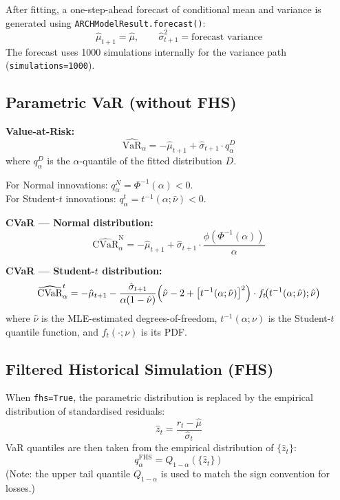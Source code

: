 \documentclass[11pt, a4paper]{article}
\begin{document}
After fitting, a one-step-ahead forecast of conditional mean and variance
is generated using \texttt{ARCHModelResult.forecast()}:
\begin{equation}
\hat{\mu}_{t+1} = \hat{\mu}, \qquad \hat{\sigma}_{t+1}^2 = \text{forecast variance}
\end{equation}
The forecast uses 1000 simulations internally for the variance path
(\texttt{simulations=1000}).

\subsection{Parametric VaR (without FHS)}

\textbf{Value-at-Risk:}
\begin{equation}
\widehat{\text{VaR}}_\alpha
= -\hat{\mu}_{t+1} + \hat{\sigma}_{t+1} \cdot q_\alpha^D
\label{eq:gjr_var}
\end{equation}
where $q_\alpha^D$ is the $\alpha$-quantile of the fitted distribution $D$.

For Normal innovations: $q_\alpha^N = \Phi^{-1}(\alpha) < 0$. \\
For Student-$t$ innovations: $q_\alpha^t = t^{-1}(\alpha; \hat{\nu}) < 0$.

\textbf{CVaR --- Normal distribution:}
\begin{equation}
\widehat{\text{CVaR}}_\alpha^{\text{N}}
= -\hat{\mu}_{t+1} + \hat{\sigma}_{t+1} \cdot
  \frac{\phi\!\left(\Phi^{-1}(\alpha)\right)}{\alpha}
\label{eq:gjr_cvar_norm}
\end{equation}

\textbf{CVaR --- Student-$t$ distribution:}
\begin{equation}
\widehat{\text{CVaR}}_\alpha^{t}
= -\hat{\mu}_{t+1}
  - \frac{\hat{\sigma}_{t+1}}{\alpha(1 - \hat{\nu})}
    \Bigl(\hat{\nu} - 2 + \bigl[t^{-1}(\alpha;\hat{\nu})\bigr]^2\Bigr)
    \cdot f_t\!\bigl(t^{-1}(\alpha;\hat{\nu});\hat{\nu}\bigr)
\label{eq:gjr_cvar_t}
\end{equation}
where $\hat{\nu}$ is the MLE-estimated degrees-of-freedom, $t^{-1}(\alpha;\nu)$
is the Student-$t$ quantile function, and $f_t(\cdot;\nu)$ is its PDF.

\subsection{Filtered Historical Simulation (FHS)}

When \texttt{fhs=True}, the parametric distribution is replaced by the
empirical distribution of standardised residuals:
\begin{equation}
\hat{z}_t = \frac{r_t - \hat{\mu}}{\hat{\sigma}_t}
\end{equation}
VaR quantiles are then taken from the empirical distribution of $\{\hat{z}_t\}$:
\begin{equation}
q_\alpha^{\text{FHS}} = Q_{1-\alpha}\!\left(\{\hat{z}_t\}\right)
\end{equation}
(Note: the upper tail quantile $Q_{1-\alpha}$ is used to match the sign
convention for losses.)
\end{document}
